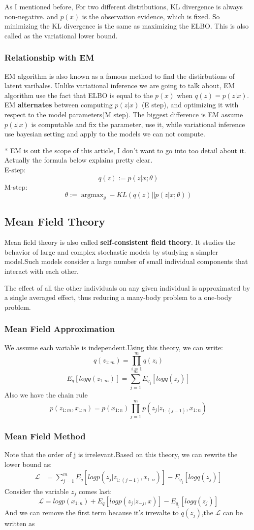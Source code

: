 \documentclass{article}
\begin{document}
As I mentioned before, For two different distributions, KL divergence is always non-negative. and $p(x)$ is the observation evidence, which is fixed. So minimizing the KL divergence is the same as maximizing the ELBO. This is also called as the variational lower bound.
\subsubsection{Relationship with EM}
EM algorithm is also known as a famous method to find the distirbutions of latent varibales. Unlike variational inference we are going to talk about, EM algorithm use the fact that ELBO is equal to the $p(x)$ when $q(z)=p(z|x)$. EM \textbf{alternates} between computing $p(z|x)$ (E step), and optimizing it with respect to the model parameters(M step). The biggest difference is EM assume $p(z|x)$ is computable and fix the parameter, use it, while variational inference use bayesian setting and apply to the models we can not compute. 

* EM is out the scope of this article, I don't want to go into too detail about it. Actually the formula below explains pretty clear.\\
E-step:
$$q(z):=p(z|x;\theta)$$
M-step:
$$\theta:=\mathop{\arg\max}_{\theta} -KL(q(z)||p(z|x;\theta))$$


\subsection{Mean Field Theory}
Mean field theory is also called \textbf{self-consistent field theory}. It studies the behavior of large and complex stochastic models by studying a simpler model.Such models consider a large number of small individual components that interact with each other.

The effect of all the other individuals on any given individual is approximated by a single averaged effect, thus reducing a many-body problem to a one-body problem.
\subsubsection{Mean Field Approximation}
We assume each variable is independent.Using this theory, we can write:
$$q(z_{1:m})= \prod _{i=1}^{m}q(z_{i})$$
$$E_{q}[logq(z_{1:m})]=\sum_{j=1}^{m}E_{q_{j}}[logq(z_{j})]$$
Also we have the chain rule 
$$p(z_{1:m},x_{1:n})=p(x_{1:n}) \prod_{j=1}^{m}p(z_{j}|z_{1:(j-1)},x_{1:n})$$
\subsubsection{Mean Field Method}
Note that the order of j is irrelevant.Based on this theory, we can rewrite the lower bound as:
\begin{align*}
\mathcal{L} &= \sum_{j=1}^{m} E_{q}[logp(z_{j}|z_{1:(j-1)},x_{1:n})]-E_{q_{j}}[logq(z_{j})] 
\end{align*}
Consider the variable $z_{j}$ comes last: 
$$\mathcal{L} =logp(x_{1:n})+E_{q}[logp(z_{j}|z_{-j},x)]-E_{q_{j}}[logq(z_{j})]$$
And we can remove the first term because it's irrevalte to $q(z_{j})$,the $\mathcal{L}$ can be written as
\end{document}
